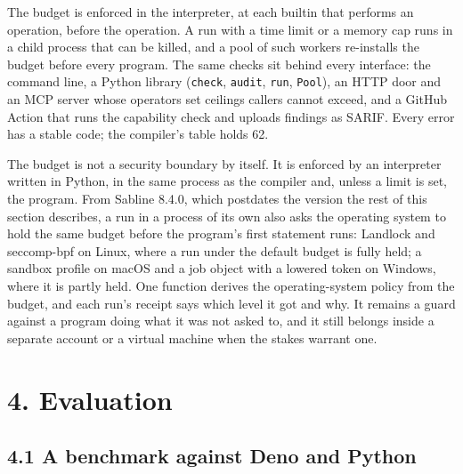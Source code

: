 \documentclass[
]{article}
\begin{document}
The budget is enforced in the interpreter, at each builtin that performs
an operation, before the operation. A run with a time limit or a memory
cap runs in a child process that can be killed, and a pool of such
workers re-installs the budget before every program. The same checks sit
behind every interface: the command line, a Python library
(\texttt{check}, \texttt{audit}, \texttt{run}, \texttt{Pool}), an HTTP
door and an MCP server whose operators set ceilings callers cannot
exceed, and a GitHub Action that runs the capability check and uploads
findings as SARIF. Every error has a stable code; the compiler's table
holds 62.

The budget is not a security boundary by itself. It is enforced by an
interpreter written in Python, in the same process as the compiler and,
unless a limit is set, the program. From Sabline 8.4.0, which postdates
the version the rest of this section describes, a run in a process of
its own also asks the operating system to hold the same budget before
the program's first statement runs: Landlock and seccomp-bpf on Linux,
where a run under the default budget is fully held; a sandbox profile on
macOS and a job object with a lowered token on Windows, where it is
partly held. One function derives the operating-system policy from the
budget, and each run's receipt says which level it got and why. It
remains a guard against a program doing what it was not asked to, and it
still belongs inside a separate account or a virtual machine when the
stakes warrant one.

\section{4. Evaluation}\label{evaluation}

\subsection{4.1 A benchmark against Deno and
Python}\label{a-benchmark-against-deno-and-python}
\end{document}
